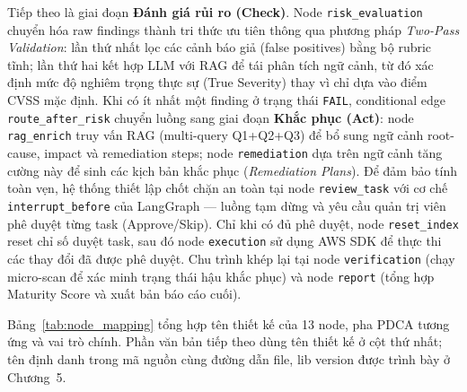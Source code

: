 Tiếp theo là giai đoạn \textbf{Đánh giá rủi ro (Check)}. Node \texttt{risk\_evaluation} chuyển hóa raw findings thành tri thức ưu tiên thông qua phương pháp \textit{Two-Pass Validation}: lần thứ nhất lọc các cảnh báo giả (false positives) bằng bộ rubric tĩnh; lần thứ hai kết hợp LLM với RAG để tái phân tích ngữ cảnh, từ đó xác định mức độ nghiêm trọng thực sự (True Severity) thay vì chỉ dựa vào điểm CVSS mặc định. Khi có ít nhất một finding ở trạng thái \texttt{FAIL}, conditional edge \texttt{route\_after\_risk} chuyển luồng sang giai đoạn \textbf{Khắc phục (Act)}: node \texttt{rag\_enrich} truy vấn RAG (multi-query Q1+Q2+Q3) để bổ sung ngữ cảnh root-cause, impact và remediation steps; node \texttt{remediation} dựa trên ngữ cảnh tăng cường này để sinh các kịch bản khắc phục (\textit{Remediation Plans}). Để đảm bảo tính toàn vẹn, hệ thống thiết lập chốt chặn an toàn tại node \texttt{review\_task} với cơ chế \texttt{interrupt\_before} của LangGraph — luồng tạm dừng và yêu cầu quản trị viên phê duyệt từng task (Approve/Skip). Chỉ khi có đủ phê duyệt, node \texttt{reset\_index} reset chỉ số duyệt task, sau đó node \texttt{execution} sử dụng AWS SDK để thực thi các thay đổi đã được phê duyệt. Chu trình khép lại tại node \texttt{verification} (chạy micro-scan để xác minh trạng thái hậu khắc phục) và node \texttt{report} (tổng hợp Maturity Score và xuất bản báo cáo cuối).

Bảng~\ref{tab:node_mapping} tổng hợp tên thiết kế của 13 node, pha PDCA tương ứng và vai trò chính. Phần văn bản tiếp theo dùng tên thiết kế ở cột thứ nhất; tên định danh trong mã nguồn cùng đường dẫn file, lib version được trình bày ở Chương~5.

